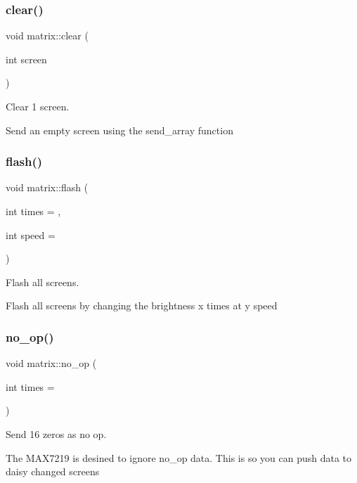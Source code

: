 \subsubsection{\texorpdfstring{clear()}{clear()}}
{\footnotesize\ttfamily void matrix\+::clear (\begin{DoxyParamCaption}\item[{int}]{screen }\end{DoxyParamCaption})}



Clear 1 screen. 

Send an empty screen using the send\+\_\+array function \mbox{\label{classmatrix_a8403a5d8bc178bf856a1a2658a8f8656}} 
\subsubsection{\texorpdfstring{flash()}{flash()}}
{\footnotesize\ttfamily void matrix\+::flash (\begin{DoxyParamCaption}\item[{int}]{times = {},  }\item[{int}]{speed = {} }\end{DoxyParamCaption})}



Flash all screens. 

Flash all screens by changing the brightness \textquotesingle{}x\textquotesingle{} times at \textquotesingle{}y\textquotesingle{} speed \mbox{\label{classmatrix_aa61545802b99cc45f59940b4c3303a20}} 
\subsubsection{\texorpdfstring{no\+\_\+op()}{no\_op()}}
{\footnotesize\ttfamily void matrix\+::no\+\_\+op (\begin{DoxyParamCaption}\item[{int}]{times = {} }\end{DoxyParamCaption})}



Send 16 zero\textquotesingle{}s as no op. 

The M\+A\+X7219 is desined to ignore no\+\_\+op data. This is so you can push data to daisy changed screens \mbox{\label{classmatrix_a3fa696e5612f375afe4d3d39fd1131ae}} 
